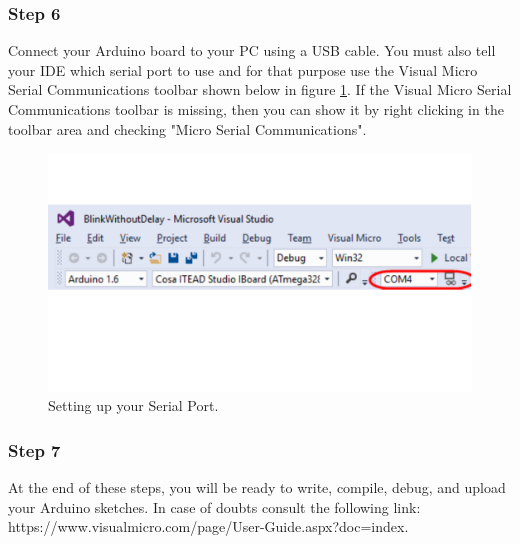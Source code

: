 \begin{refsection}
\subsubsection{Step 6}

Connect your Arduino board to your PC using a USB cable. You must also tell your IDE which serial port to use and for that purpose use the Visual Micro Serial Communications toolbar shown below in figure \ref{selectSerial}. If the Visual Micro Serial Communications toolbar is missing, then you can show it by right clicking in the toolbar area and checking "Micro Serial Communications".

\begin{figure}[H]
	\centering
	\includegraphics[width=0.7\linewidth]{./sdf/arduino_quantum_rx/figures/selectSerial.pdf}
	\caption{Setting up your Serial Port.}
	\label{selectSerial}
\end{figure}

\subsubsection{Step 7}
 At the end of these steps, you will be ready to write, compile, debug, and upload your Arduino sketches. In case of doubts consult the following link: https://www.visualmicro.com/page/User-Guide.aspx?doc=index.

\clearpage
\printbibliography[heading=subbibliography]
\end{refsection}
\cleardoublepage
